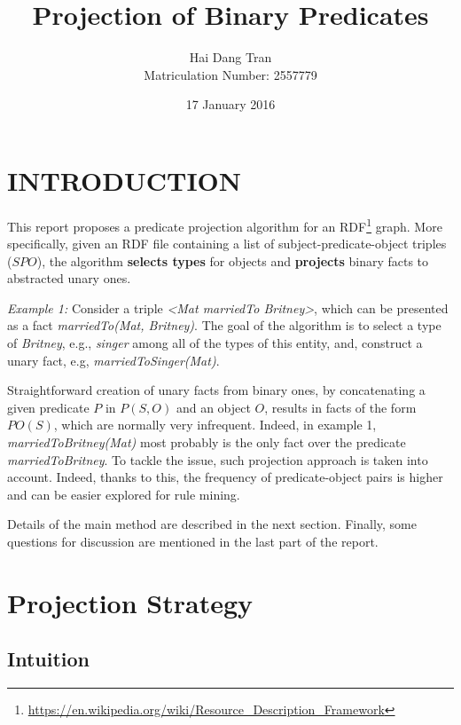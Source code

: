 \documentclass{acm_proc_article-sp}
\begin{document}
\title{Projection of Binary Predicates}
\author{
\alignauthor
Hai Dang Tran\\Matriculation Number: 2557779
}
\date{17 January 2016}

\maketitle

\section{INTRODUCTION}
This report proposes a predicate projection algorithm for an RDF\footnote{\url{https://en.wikipedia.org/wiki/Resource_Description_Framework}} graph. More specifically, given an RDF file containing a list of subject-predicate-object triples ($SPO$), the algorithm \textbf{selects types} for objects and \textbf{projects} binary facts to abstracted unary ones.

\textit{Example 1:} Consider a triple \textit{<Mat marriedTo Britney>}, which can be presented as a fact \textit{marriedTo(Mat, Britney)}. The goal of the algorithm is to select a type of \textit{Britney}, e.g., \textit{singer} among all of the types of this entity, and, construct a unary fact, e.g, \textit{marriedToSinger(Mat)}.

Straightforward creation of unary facts from binary ones, by concatenating a given predicate $P$ in $P(S, O)$ and an object $O$, results in facts of the form $PO(S)$, which are normally very infrequent. Indeed, in example 1, \textit{marriedToBritney(Mat)} most probably is the only fact over the predicate \textit{marriedToBritney}. To tackle the issue, such projection approach is taken into account. Indeed, thanks to this, the frequency of predicate-object pairs is higher and can be easier explored for rule mining.

Details of the main method are described in the next section. Finally, some questions for discussion are mentioned in the last part of the report.

\section{Projection Strategy}

\subsection{Intuition}
\end{document}
